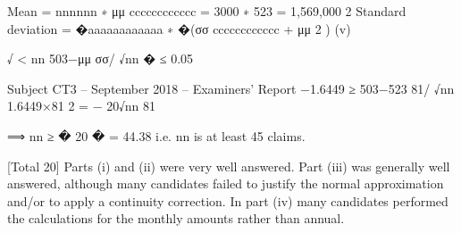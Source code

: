Mean = \lambda\lambda nnnnnn ∗ μμ cccccccccccc = 3000 ∗ 523 = 1,569,000
2
Standard deviation = �\lambda\lambda aaaaaaaaaaaa ∗ �(σσ cccccccccccc
+ μμ 2 )
(v)

√
<
nn
503−μμ
σσ/ √nn
� ≤ 0.05

Subject CT3  – September 2018 – Examiners’ Report
−1.6449 ≥
503−523
81/ √nn
1.6449×81 2
= −
20√nn
81

⟹ nn ≥ � 20 � = 44.38
i.e. nn is at least 45 claims.


[Total 20]
Parts (i) and (ii) were very well answered. Part (iii) was generally well
answered, although many candidates failed to justify the normal
approximation and/or to apply a continuity correction. In part (iv)
many candidates performed the calculations for the monthly amounts
rather than annual.
